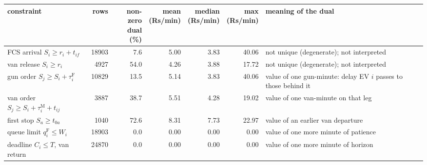 \begin{tabular}{p{3.6cm}rrrrrp{4.4cm}}\toprule
constraint & rows & \shortstack{non-zero\\dual (\%)} & \shortstack{mean\\(Rs/min)} & \shortstack{median\\(Rs/min)} & \shortstack{max\\(Rs/min)} & meaning of the dual \\ \midrule
FCS arrival $S_i\ge r_i+t_{if}$ & 18903 & 7.6 & 5.00 & 3.83 & 40.06 & not unique (degenerate); not interpreted \\
van release $S_i\ge r_i$ & 4927 & 54.0 & 4.26 & 3.88 & 17.72 & not unique (degenerate); not interpreted \\
gun order $S_j\ge S_i+\tau^{\mathrm{F}}_i$ & 10829 & 13.5 & 5.14 & 3.83 & 40.06 & value of one gun-minute: delay EV $i$ passes to those behind it \\
van order $S_j\ge S_i+\tau^{\mathrm{M}}_i+t_{ij}$ & 3887 & 38.7 & 5.51 & 4.28 & 19.02 & value of one van-minute on that leg \\
first stop $S_a\ge t_{0a}$ & 1040 & 72.6 & 8.31 & 7.73 & 22.97 & value of an earlier van departure \\
queue limit $q^{\mathrm{F}}_i\le W_i$ & 18903 & 0.0 & 0.00 & 0.00 & 0.00 & value of one more minute of patience \\
deadline $C_i\le T$, van return & 24870 & 0.0 & 0.00 & 0.00 & 0.00 & value of one more minute of horizon \\
\bottomrule\end{tabular}
